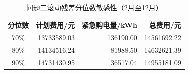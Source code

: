 \begin{table}[H]\centering\small
\caption{问题二滚动残差分位数敏感性（2月至12月）}\label{tab:q2-quantile}
\begin{tabular}{crrr}\toprule
分位数 & 计划费用/元 & 紧急购电量/kWh & 总费用/元\\\midrule
70\% & 13733589.03 & 136190.00 & 14561692.22\\
80\% & 14134516.24 & 81988.50 & 14632621.39\\
90\% & 14731430.95 & 36517.04 & 14955181.09\\
\bottomrule\end{tabular}\end{table}
